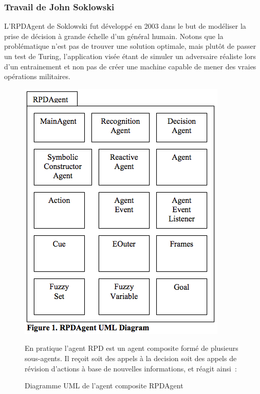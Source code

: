 \documentclass{article}
\begin{document}
\subsubsection{Travail de John Soklowski}
L'RPDAgent de Soklowski fut développé en 2003 dans le but de modéliser la prise de décision à grande échelle d'un général humain. Notons que la problématique n'est pas de trouver une solution optimale, mais plutôt de passer un test de Turing, l'application visée étant de simuler un adversaire réaliste lors d'un entrainement et non pas de créer une machine capable de mener des vraies opérations militaires.
\begin{figure}[H]
\centering
\begin{minipage}[H]{0.4\linewidth}
	\centering
	\includegraphics[width=\textwidth]{../ressources/RPDagent_uml}
	\caption{Diagramme UML de l'agent composite RPDAgent}
\end{minipage}
\hfill
\begin{minipage}[H]{0.55\linewidth}
En pratique l'agent RPD est un agent composite formé de plusieurs sous-agents. Il reçoit soit des appels à la decision soit des appels de révision d'actions à base de nouvelles informations, et réagit ainsi~:

\end{minipage}
\end{figure}
\end{document}
